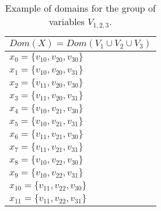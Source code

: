 \begin{table}[]
\centering
\begin{tabular}{|l|}
      $Dom(X) = Dom(V_1 \cup V_2 \cup V_3 )$  \\
      \hline
$x_0 = \lbrace v_{10}, v_{20}, v_{30}  \rbrace$ \\ \hline
$x_1 = \lbrace v_{10}, v_{20}, v_{31}  \rbrace$ \\ \hline
$x_2 = \lbrace v_{11}, v_{20}, v_{30}  \rbrace$ \\ \hline
$x_3 = \lbrace v_{11}, v_{20}, v_{31}  \rbrace$ \\ \hline
$x_4 = \lbrace v_{10}, v_{21}, v_{30}  \rbrace$ \\ \hline
$x_5 = \lbrace v_{10}, v_{21}, v_{31}  \rbrace$ \\ \hline
$x_6 = \lbrace v_{11}, v_{21}, v_{30}  \rbrace$ \\ \hline
$x_7 = \lbrace v_{11}, v_{21}, v_{31}  \rbrace$ \\ \hline
$x_8 = \lbrace v_{10}, v_{22}, v_{30}  \rbrace$ \\ \hline
$x_9 = \lbrace v_{10}, v_{22}, v_{31}  \rbrace$ \\ \hline
$x_{10} = \lbrace v_{11}, v_{22}, v_{30}  \rbrace$ \\ \hline
$x_{11} = \lbrace v_{11}, v_{22}, v_{31}  \rbrace$ \\ \hline
\end{tabular}
\caption{Example of domains for the group of variables $V_{1,2,3}$.} 
\label{tab:00:t0_2}
\end{table}

